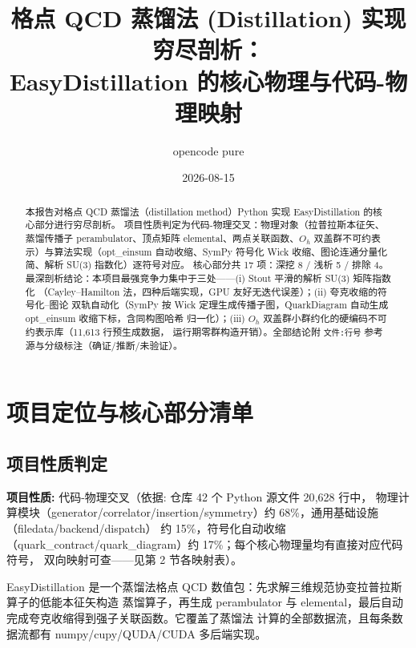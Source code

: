 \documentclass[UTF8]{ctexart}
\title{格点 QCD 蒸馏法 (Distillation) 实现穷尽剖析：\\ EasyDistillation 的核心物理与代码-物理映射}
\author{opencode pure}
\date{2026-08-15}
\begin{document}
\maketitle

\begin{abstract}
本报告对格点 QCD 蒸馏法（distillation method）Python 实现 EasyDistillation 的核心部分进行穷尽剖析。
项目性质判定为\textcolor{map}{代码-物理交叉}：物理对象（拉普拉斯本征矢、蒸馏传播子 perambulator、顶点矩阵
elemental、两点关联函数、$O_h$ 双盖群不可约表示）与算法实现（opt\_einsum 自动收缩、SymPy 符号化 Wick
收缩、图论连通分量化简、解析 SU(3) 指数化）逐符号对应。
核心部分共 17 项：\textcolor{accent}{深挖 8} / \textcolor{phys}{浅析 5} / \textcolor{warn}{排除 4}。
最深剖析结论：本项目最强竞争力集中于三处——(i) \textcolor{algo}{Stout 平滑的解析 SU(3) 矩阵指数化}
（Cayley--Hamilton 法，四种后端实现，GPU 友好无迭代误差）；(ii) \textcolor{algo}{夸克收缩的符号化--图论
双轨自动化}（SymPy 按 Wick 定理生成传播子图，QuarkDiagram 自动生成 opt\_einsum 收缩下标，含同构图哈希
归一化）；(iii) \textcolor{phys}{$O_h$ 双盖群小群约化的硬编码不可约表示库}（11{,}613 行预生成数据，
运行期零群构造开销）。全部结论附 \texttt{文件:行号} 参考源与分级标注（确证/推断/未验证）。
\end{abstract}

\tableofcontents

\section{项目定位与核心部分清单}

\subsection{项目性质判定}
\begin{keybox}
\textbf{项目性质:} \textcolor{phys}{代码-物理交叉}（依据: 仓库 42 个 Python 源文件 20{,}628 行中，
物理计算模块（generator/correlator/insertion/symmetry）约 68\%，通用基础设施（filedata/backend/dispatch）
约 15\%，符号化自动收缩（quark\_contract/quark\_diagram）约 17\%；每个核心物理量均有直接对应代码符号，
双向映射可查——见第 2 节各映射表）。
\end{keybox}

EasyDistillation 是一个蒸馏法格点 QCD 数值包：先求解三维规范协变拉普拉斯算子的低能本征矢构造
蒸馏算子，再生成 perambulator 与 elemental，最后自动完成夸克收缩得到强子关联函数。它覆盖了蒸馏法
计算的全部数据流，且每条数据流都有 numpy/cupy/QUDA/CUDA 多后端实现。
\end{document}
